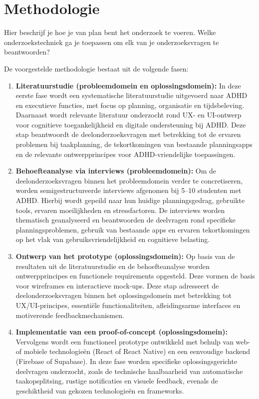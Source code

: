 \section{Methodologie}
\label{sec:methodologie}

Hier beschrijf je hoe je van plan bent het onderzoek te voeren. Welke onderzoekstechniek ga je toepassen om elk van je onderzoeksvragen te beantwoorden?

De voorgestelde methodologie bestaat uit de volgende fasen:

\begin{enumerate}
  \item \textbf{Literatuurstudie (probleemdomein en oplossingsdomein):}  
  In deze eerste fase wordt een systematische literatuurstudie uitgevoerd naar ADHD en executieve functies, met focus op planning, organisatie en tijdsbeleving. Daarnaast wordt relevante literatuur onderzocht rond UX- en UI-ontwerp voor cognitieve toegankelijkheid en digitale ondersteuning bij ADHD.  
  Deze stap beantwoordt de deelonderzoeksvragen met betrekking tot de ervaren problemen bij taakplanning, de tekortkomingen van bestaande planningsapps en de relevante ontwerpprincipes voor ADHD-vriendelijke toepassingen.

  \item \textbf{Behoefteanalyse via interviews (probleemdomein):}  
  Om de deelonderzoeksvragen binnen het probleemdomein verder te concretiseren, worden semigestructureerde interviews afgenomen bij 5–10 studenten met ADHD. Hierbij wordt gepeild naar hun huidige planningsgedrag, gebruikte tools, ervaren moeilijkheden en stressfactoren.  
  De interviews worden thematisch geanalyseerd en beantwoorden de deelvragen rond specifieke planningsproblemen, gebruik van bestaande apps en ervaren tekortkomingen op het vlak van gebruiksvriendelijkheid en cognitieve belasting.

  \item \textbf{Ontwerp van het prototype (oplossingsdomein):}  
  Op basis van de resultaten uit de literatuurstudie en de behoefteanalyse worden ontwerpprincipes en functionele requirements opgesteld. Deze vormen de basis voor wireframes en interactieve mock-ups.  
  Deze stap adresseert de deelonderzoeksvragen binnen het oplossingsdomein met betrekking tot UX/UI-principes, essentiële functionaliteiten, afleidingsarme interfaces en motiverende feedbackmechanismen.

  \item \textbf{Implementatie van een proof-of-concept (oplossingsdomein):}  
  Vervolgens wordt een functioneel prototype ontwikkeld met behulp van web- of mobiele technologieën (React of React Native) en een eenvoudige backend (Firebase of Supabase).  
  In deze fase worden specifieke oplossingsgerichte deelvragen onderzocht, zoals de technische haalbaarheid van automatische taakopsplitsing, rustige notificaties en visuele feedback, evenals de geschiktheid van gekozen technologieën en frameworks.


\end{enumerate}
